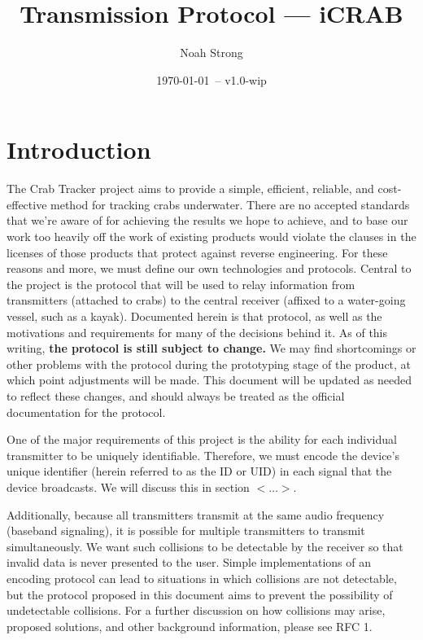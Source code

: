 \documentclass[12pt]{article}
\title{Transmission Protocol --- iCRAB}
\author{
	Noah Strong
}
\date{\today\ -- v1.0-wip}
\begin{document}
\maketitle

\tableofcontents{}

\newpage

\section{Introduction} \label{introduction}

The Crab Tracker project aims to provide a simple, efficient, reliable, and
cost-effective method for tracking crabs underwater. There are no accepted
standards that we're aware of for achieving the results we hope to achieve,
and to base our work too heavily off the work of existing products would
violate the clauses in the licenses of those products that protect against
reverse engineering.
For these reasons and more, we must define our own technologies and protocols.
Central to the project is the protocol that will be used to relay information
from transmitters (attached to crabs) to the central receiver (affixed to a
water-going vessel, such as a kayak).
Documented herein is that protocol, as well as the motivations and requirements
for many of the decisions behind it.
As of this writing, {\bf the protocol is still subject to change.}
We may find shortcomings or other problems with the protocol during
the prototyping stage of the product, at which point adjustments will be made.
This document will be updated as needed to reflect these changes,
and should always be treated as the official documentation for the protocol.

One of the major requirements of this project is the ability for each
individual transmitter to be uniquely identifiable. Therefore, we must encode
the device's unique identifier (herein referred to as the ID or UID) in each
signal that the device broadcasts.
We will discuss this in section $<\dots>$.%

Additionally, because all transmitters transmit at the same audio frequency
(baseband signaling), it is possible for multiple transmitters to transmit
simultaneously. We want such collisions to be detectable by the receiver
so that invalid data is never presented to the user. Simple implementations
of an encoding protocol can lead to situations in which collisions are not
detectable, but the protocol proposed in this document aims to prevent the
possibility of undetectable collisions. For a further discussion on how
collisions may arise, proposed solutions, and other background information,
please see RFC 1.
\end{document}
